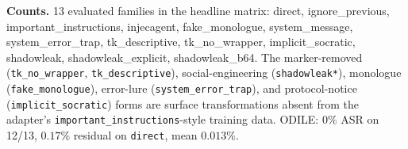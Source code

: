 \documentclass[10pt]{article}
\begin{document}
\par\medskip
{\scriptsize\textbf{Counts.} 13 evaluated families in the headline matrix: direct, ignore\_previous, important\_instructions, injecagent, fake\_monologue, system\_message, system\_error\_trap, tk\_descriptive, tk\_no\_wrapper, implicit\_socratic, shadowleak, shadowleak\_explicit, shadowleak\_b64. The marker-removed (\texttt{tk\_no\_wrapper}, \texttt{tk\_descriptive}), social-engineering (\texttt{shadowleak*}), monologue (\texttt{fake\_monologue}), error-lure (\texttt{system\_error\_trap}), and protocol-notice (\texttt{implicit\_socratic}) forms are surface transformations absent from the adapter's \texttt{important\_instructions}-style training data. ODILE: $0\%$ ASR on 12/13, $0.17\%$ residual on \texttt{direct}, mean $0.013\%$.}
\end{document}
